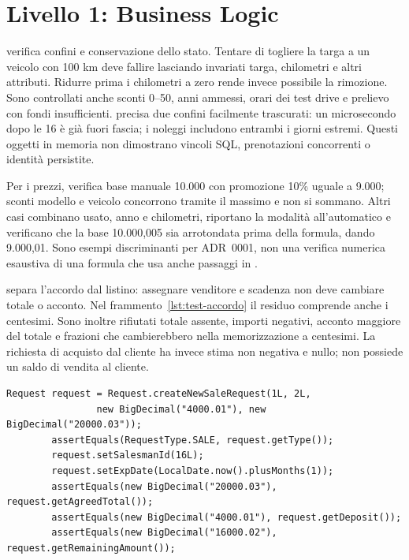 \section{Livello 1: Business Logic}\label{sec:test-business}
 verifica confini e conservazione dello stato.
Tentare di togliere la targa a un veicolo con 100 km deve fallire lasciando
invariati targa, chilometri e altri attributi. Ridurre prima i chilometri
a zero rende invece possibile la rimozione. Sono controllati anche sconti
0--50, anni ammessi, orari dei test drive e prelievo con fondi insufficienti.
 precisa due confini facilmente trascurati:
un microsecondo dopo le 16 è già fuori fascia; i noleggi includono entrambi
i giorni estremi. Questi oggetti in memoria non dimostrano vincoli SQL,
prenotazioni concorrenti o identità persistite.

Per i prezzi,  verifica base manuale
10.000 con promozione 10\% uguale a 9.000; sconti modello e veicolo
concorrono tramite il massimo e non si sommano. Altri casi combinano usato,
anno e chilometri, riportano la modalità all'automatico e verificano che
la base 10.000,005 sia arrotondata prima della formula, dando 9.000,01.
Sono esempi discriminanti per ADR~0001, non una verifica numerica esaustiva
di una formula che usa anche passaggi in .

 separa l'accordo dal listino: assegnare
venditore e scadenza non deve cambiare totale o acconto. Nel
frammento~\ref{lst:test-accordo} il residuo comprende anche i centesimi.
Sono inoltre rifiutati totale assente, importi negativi, acconto maggiore
del totale e frazioni che cambierebbero nella memorizzazione a centesimi.
La richiesta di acquisto dal cliente ha invece stima non negativa e
 nullo; non possiede un saldo di vendita al cliente.

\noindent\begin{minipage}{\linewidth}
\begin{lstlisting}[firstnumber=17,caption={\code{RequestAgreementTest.java}: estratto della prova.},label=lst:test-accordo]
        Request request = Request.createNewSaleRequest(1L, 2L,
                new BigDecimal("4000.01"), new BigDecimal("20000.03"));
        assertEquals(RequestType.SALE, request.getType());
        request.setSalesmanId(16L);
        request.setExpDate(LocalDate.now().plusMonths(1));
        assertEquals(new BigDecimal("20000.03"), request.getAgreedTotal());
        assertEquals(new BigDecimal("4000.01"), request.getDeposit());
        assertEquals(new BigDecimal("16000.02"), request.getRemainingAmount());
\end{lstlisting}
\end{minipage}

